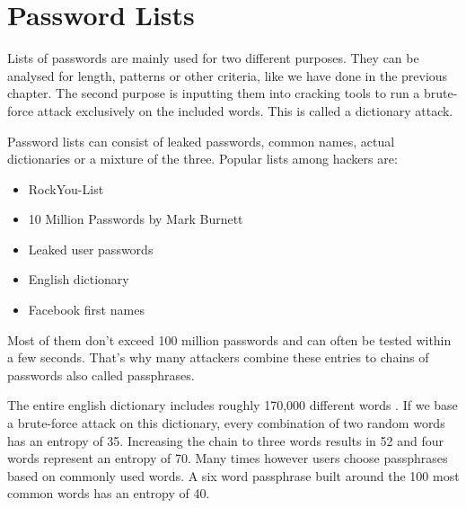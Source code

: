 \section{Password Lists}

Lists of passwords are mainly used for two different purposes. They can be analysed for length, patterns or other criteria, like we have done in the previous chapter. The second purpose is inputting them into cracking tools to run a brute-force attack exclusively on the included words. This is called a dictionary attack.

Password lists can consist of leaked passwords, common names, actual dictionaries or a mixture of the three. Popular lists among hackers are:

\begin{itemize}
\item RockYou-List 
\item 10 Million Passwords by Mark Burnett
\item Leaked user passwords
\item English dictionary
\item Facebook first names
\end{itemize}

Most of them don't exceed 100 million passwords and can often be tested within a few seconds. That's why many attackers combine these entries to chains of passwords also called passphrases.

The entire english dictionary includes roughly 170,000 different words \cite{dictionary}. If we base a brute-force attack on this dictionary, every combination of two random words has an entropy of 35. Increasing the chain to three words results in 52 and four words represent an entropy of 70. Many times however users choose passphrases based on commonly used words. A six word passphrase built around the 100 most common words has an entropy of 40. 

\newpage